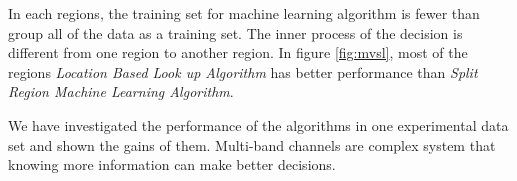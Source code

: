 In each regions, the training set for machine learning algorithm is fewer than group all of the data as a training set. 
The inner process of the decision is different from one region to another region.
In figure \ref{fig:mvsl}, most of the regions \emph{Location Based Look up Algorithm} has better performance than \emph{Split Region Machine Learning Algorithm}. 

We have investigated the performance of the algorithms in one experimental data set and shown the gains of them. Multi-band channels are complex system that knowing more information can make better decisions.





